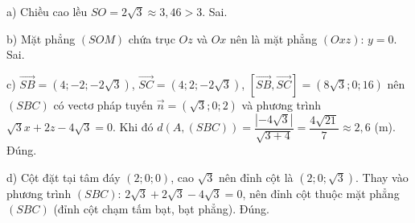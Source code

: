 \begin{ex}
{a) Chiều cao lều $SO=2\sqrt3\approx3{,}46>3$. Sai.

b) Mặt phẳng $(SOM)$ chứa trục $Oz$ và $Ox$ nên là mặt phẳng $(Oxz)$: $y=0$. Sai.

c) $\overrightarrow{SB}=(4;-2;-2\sqrt3)$, $\overrightarrow{SC}=(4;2;-2\sqrt3)$, $[\overrightarrow{SB},\overrightarrow{SC}]=(8\sqrt3;0;16)$ nên $(SBC)$ có vectơ pháp tuyến $\vec n=(\sqrt3;0;2)$ và phương trình $\sqrt3x+2z-4\sqrt3=0$. Khi đó $d(A,(SBC))=\dfrac{|-4\sqrt3|}{\sqrt{3+4}}=\dfrac{4\sqrt{21}}{7}\approx2{,}6$ (m). Đúng.

d) Cột đặt tại tâm đáy $(2;0;0)$, cao $\sqrt3$ nên đỉnh cột là $(2;0;\sqrt3)$. Thay vào phương trình $(SBC)$: $2\sqrt3+2\sqrt3-4\sqrt3=0$, nên đỉnh cột thuộc mặt phẳng $(SBC)$ (đỉnh cột chạm tấm bạt, bạt phẳng). Đúng.}
\end{ex}
